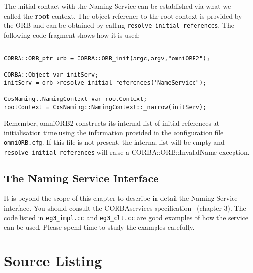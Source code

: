 \documentclass[11pt,twoside,onecolumn]{book}
\begin{document}
The initial contact with the Naming Service can be established via what we
called the {\bf root} context. The object reference to the root context is
provided by the ORB and can be obtained by calling
{\tt resolve\_initial\_references}. The following code fragment shows how
it is used:

{\small
\begin{verbatim}

CORBA::ORB_ptr orb = CORBA::ORB_init(argc,argv,"omniORB2");

CORBA::Object_var initServ;
initServ = orb->resolve_initial_references("NameService");

CosNaming::NamingContext_var rootContext;
rootContext = CosNaming::NamingContext::_narrow(initServ);

\end{verbatim}
}

Remember, omniORB2 constructs its internal list of initial references at
initialisation time using the information provided in the configuration
file {\tt omniORB.cfg}. If this file is not present, the internal list will
be empty and {\tt resolve\_initial\_references} will raise a 
CORBA::ORB::InvalidName exception. 

\subsection{The Naming Service Interface}

It is beyond the scope of this chapter to describe in detail the Naming
Service interface. You should consult the CORBAservices
specification~\cite{corbaservices} (chapter 3). The
code listed in {\tt eg3\_impl.cc} and {\tt eg3\_clt.cc} are good examples
of how the service can be used. Please spend time to study the examples
carefully.

\newpage
\section{Source Listing}
\end{document}

